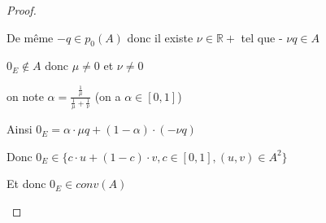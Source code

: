 \documentclass[a4paper]{article}
\begin{document}
\begin{proof}
\begin{itemize}
    De même $-q \in p_{0}(A)$ donc il existe $\nu \in \mathbb{R}+$ tel que - $\nu q \in A$

    $0_{E} \notin A$ donc $\mu \neq 0$ et $\nu \neq 0$

    on note $\alpha = \frac{\frac{1}{\mu}}{\frac{1}{\mu} + \frac{1}{\nu}}$ (on a $\alpha \in [0, 1]$)

    Ainsi $0_{E} = \alpha \cdot \mu q + (1 - \alpha) \cdot (- \nu  q)$

    Donc $0_{E} \in \{c \cdot u + (1 - c) \cdot v, c \in [0, 1], (u, v) \in A^{2} \}$


    Et donc $0_{E} \in conv(A)$
    \end{itemize}
    \end{proof}
\end{document}

